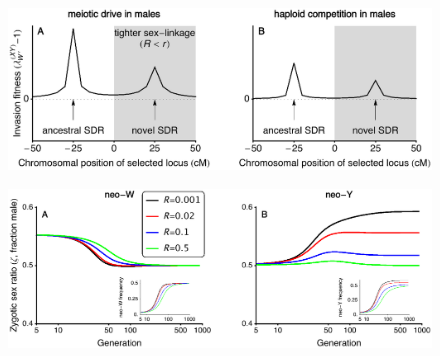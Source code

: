\documentclass[12pt]{article}
\begin{document}
\newpage
\begin{figure}[!h]
\centering
\centerline{\includegraphics[width=\linewidth]{PositionPlot.eps}}
\caption{}
\end{figure}

\begin{figure}[!h]
\centering
\centerline{\includegraphics[width=\linewidth]{Temporal_SR.eps}}
\caption{}
\end{figure}
\end{document}
